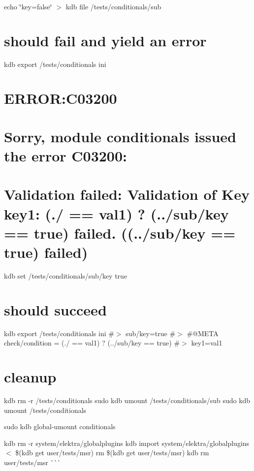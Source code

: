 echo \char`\"{}key=false\char`\"{} $>$ {\ttfamily kdb file /tests/conditionals/sub}\hypertarget{autotoc_md88_autotoc_md100}{}\section{should fail and yield an error}\label{autotoc_md88_autotoc_md100}
kdb export /tests/conditionals ini \hypertarget{autotoc_md88_autotoc_md101}{}\section{E\+R\+R\+O\+R\+:\+C03200}\label{autotoc_md88_autotoc_md101}
\hypertarget{autotoc_md88_autotoc_md102}{}\section{Sorry, module conditionals issued the error C03200\+:}\label{autotoc_md88_autotoc_md102}
\hypertarget{autotoc_md88_autotoc_md103}{}\section{Validation failed\+: Validation of Key key1\+: (./ == \textquotesingle{}val1\textquotesingle{}) ? (../sub/key == \textquotesingle{}true\textquotesingle{}) failed. ((../sub/key == \textquotesingle{}true\textquotesingle{}) failed)}\label{autotoc_md88_autotoc_md103}
kdb set /tests/conditionals/sub/key true\hypertarget{autotoc_md88_autotoc_md104}{}\section{should succeed}\label{autotoc_md88_autotoc_md104}
kdb export /tests/conditionals ini \#$>$ sub/key=true \#$>$ \#@\+M\+E\+TA check/condition = (./ == \textquotesingle{}val1\textquotesingle{}) ? (../sub/key == \textquotesingle{}true\textquotesingle{}) \#$>$ key1=val1\hypertarget{autotoc_md88_autotoc_md105}{}\section{cleanup}\label{autotoc_md88_autotoc_md105}
kdb rm -\/r /tests/conditionals sudo kdb umount /tests/conditionals/sub sudo kdb umount /tests/conditionals

sudo kdb global-\/umount conditionals

kdb rm -\/r system/elektra/globalplugins kdb import system/elektra/globalplugins $<$ \$(kdb get user/tests/msr) rm \$(kdb get user/tests/msr) kdb rm user/tests/msr \`{}\`{}\`{} 